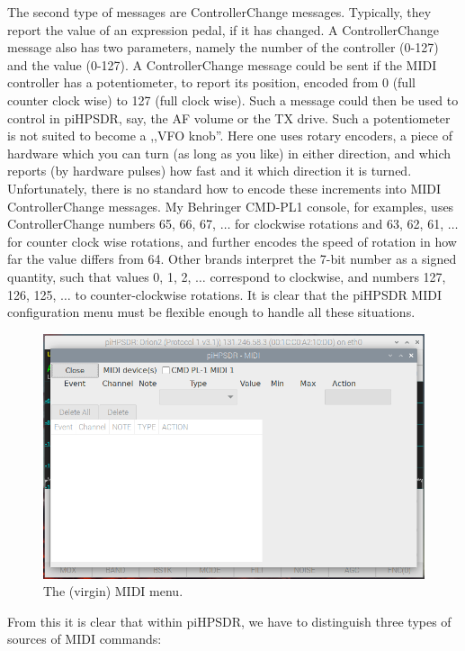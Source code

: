 \documentclass[12pt]{book}
\def\pH{pi\-HPSDR\xspace}
\begin{document}
The second type of messages are ControllerChange messages. Typically, they report the value of
an expression pedal, if it has changed. A ControllerChange message also has two parameters,
namely the number of the controller (0-127) and the value (0-127). A ControllerChange
message could be sent if the MIDI controller has a potentiometer, to report its position,
encoded from 0 (full counter clock wise) to 127 (full clock wise). Such a message could then be
used to control in \pH, say, the AF volume or the TX drive. Such a potentiometer is
not suited to become a ,,VFO knob''. Here one uses rotary encoders, a piece of hardware which
you can turn (as long as you like) in either direction, and which reports (by hardware pulses)
how fast and it which direction it is turned. Unfortunately, there is no standard how to
encode these increments into MIDI ControllerChange messages. My Behringer CMD-PL1 console,
for examples, uses ControllerChange numbers 65, 66, 67, $\ldots$ for clockwise rotations
and 63, 62, 61, $\ldots$ for counter clock wise rotations, and further encodes the speed of
rotation in how far the value differs from 64. Other brands interpret the 7-bit number
as a signed quantity, such that values 0, 1, 2, $\ldots$ correspond to clockwise,
and numbers 127, 126, 125, $\ldots$ to counter-clockwise rotations. It is clear that
the \pH MIDI configuration menu must be flexible enough to handle all these situations.

\begin{figure}[ht]
\center
\includegraphics[width=12cm]{MIDImenu1.png}
\caption{The (virgin) MIDI menu.}
\label{fig:MIDImenu1}
\end{figure}

From this it is clear that within \pH, we have to distinguish three types of sources
of MIDI commands:
\end{document}
